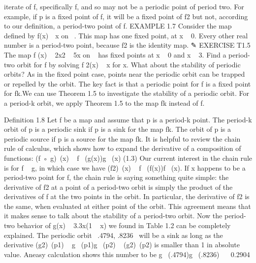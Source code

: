 \documentclass{article}
\begin{document}
iterate of f, specifically f, and so may not be a periodic point of period two. For
example, if p is a fixed point of f, it will be a fixed point of f2 but not, according
to our definition, a period-two point of f.
EXAMPLE 1.7
Consider the map defined by f(x)  x on  . This map has one fixed point,
at x   0. Every other real number is a period-two point, because f2 is the identity
map.
✎ EXERCISE T1.5
The map f (x)   2x2   5x on   has fixed points at x   0 and x   3. Find a
period-two orbit for f by solving f 2(x)   x for x.
What about the stability of periodic orbits? As in the fixed point case, points
near the periodic orbit can be trapped or repelled by the orbit. The key fact is that
a periodic point for f is a fixed point for fk.We can use Theorem 1.5 to investigate
the stability of a periodic orbit. For a period-k orbit, we apply Theorem 1.5 to the
map fk instead of f.

Definition 1.8 Let f be a map and assume that p is a period-k point. The
period-k orbit of p is a periodic sink if p is a sink for the map fk. The orbit of p is
a periodic source if p is a source for the map fk.
It is helpful to review the chain rule of calculus, which shows how to expand
the derivative of a composition of functions:
(f ◦ g) (x)   f  (g(x))g  (x) (1.3)
Our current interest in the chain rule is for f   g, in which case we have (f2) (x)  
f  (f(x))f  (x). If x happens to be a period-two point for f, the chain rule is saying
something quite simple: the derivative of f2 at a point of a period-two orbit
is simply the product of the derivatives of f at the two points in the orbit. In
particular, the derivative of f2 is the same, when evaluated at either point of the
orbit. This agreement means that it makes sense to talk about the stability of a
period-two orbit.
Now the period-two behavior of g(x)   3.3x(1   x) we found in Table 1.2
can be completely explained. The periodic orbit  .4794, .8236  will be a sink
as long as the derivative (g2) (p1)   g  (p1)g  (p2)   (g2) (p2) is smaller than 1 in
absolute value. Aneasy calculation shows this number to be g  (.4794)g  (.8236)  
 0.2904
\end{document}
